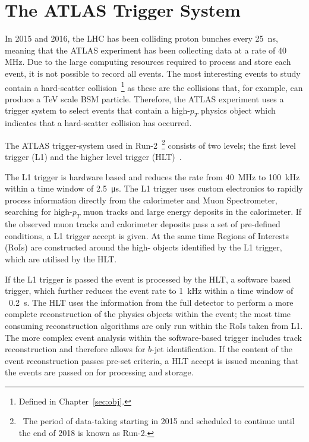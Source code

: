 \chapter{The ATLAS Trigger System}
\label{sec:trig}

In 2015 and 2016, the LHC has been colliding proton bunches every \SI{25}{\nano\second},
meaning that the ATLAS experiment has been collecting data at a rate of 40 MHz.
Due to the large computing resources required to process and store each event,
it is not possible to record all events.
The most interesting events to study contain a hard-scatter collision~\footnote{Defined in Chapter~\ref{sec:obj}.}
as these are the collisions that, for example, can produce a TeV scale BSM particle.
Therefore, the ATLAS experiment uses a trigger system to select events that 
contain a high-$p_{T}$ physics object which indicates that a hard-scatter collision has occurred.

The ATLAS trigger-system used in
Run-2~\footnote{\ The period of data-taking starting in 2015 and scheduled to continue until the end of 2018 is known as Run-2.}
consists of two levels;
the first level trigger (L1) and the higher level trigger (HLT)~\cite{trig-run2_trigger,trig-run2_proc,trig-run2_triggerPerf}.
 
The L1 trigger is hardware based and reduces the rate from 40~MHz to 100~kHz within a time window of \SI{2.5}{\micro\second}.
The L1 trigger uses custom electronics to rapidly process information directly from the
calorimeter and Muon Spectrometer, searching for high-$p_{T}$ muon tracks and large energy deposits in the calorimeter.
If the observed muon tracks and calorimeter deposits pass a set of pre-defined conditions, a L1 trigger accept is given. 
At the same time Regions of Interests (RoIs) are constructed around the high-\pT{} objects identified by the L1 trigger, which are utilised by the HLT. 

If the L1 trigger is passed the event is processed by the HLT,
a software based trigger,
which further reduces the event rate to 1~kHz within a time window of ~\SI{0.2}{\second}.
The HLT uses the information from the full detector
to perform a more complete reconstruction of the physics objects within the event;
the most time consuming reconstruction algorithms are only run within the RoIs taken from L1.
The more complex event analysis within the software-based trigger includes
track reconstruction and therefore allows for \mbox{$b$-jet} \mbox{identification}.
If the content of the event reconstruction passes pre-set criteria, a HLT accept is issued
meaning that the events are passed on for processing and storage. 

